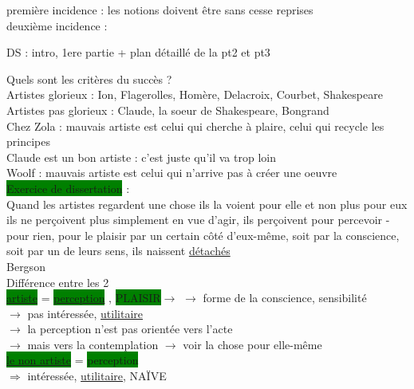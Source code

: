 \documentclass[a4paper,twocolumn,landscape]{article}
\begin{document}
\noindent
première incidence : les notions doivent être sans cesse reprises \\
deuxième incidence : 

DS : intro, 1ere partie + plan détaillé de la pt2 et pt3

\noindent
Quels sont les critères du succès ? \\
Artistes glorieux : Ion, Flagerolles, Homère, Delacroix, Courbet, Shakespeare\\
Artistes pas glorieux : Claude, la soeur de Shakespeare, Bongrand\\

\noindent
Chez Zola : mauvais artiste est celui qui cherche à plaire, celui qui recycle les principes\\
Claude est un bon artiste : c'est juste qu'il va trop loin\\
Woolf : mauvais artiste est celui qui n'arrive pas à créer une oeuvre\\

\noindent \colorbox{green}{Exercice de dissertation} : \\

\noindent
Quand les artistes regardent une chose ils la voient pour elle et 
non plus pour eux 
ils ne perçoivent plus simplement en vue d'agir, 
ils perçoivent pour percevoir - pour rien, pour le plaisir
par un certain côté d'eux-même, soit par la conscience, 
soit par un de leurs sens, ils naissent 
\underline{détachés}\\
Bergson\\

\noindent Différence entre les 2\\ 

\noindent
\colorbox{green}{\underline{artiste}} = 
\colorbox{green}{\underline{perception}} , 
\colorbox{green}{PLAISIR}\(\rightarrow\)  
\(\rightarrow\) forme de la conscience, sensibilité\\
\(\rightarrow\) pas intéressée, \underline{utilitaire}\\
\(\rightarrow\) la perception n'est pas orientée vers l'acte\\
\(\rightarrow\) mais vers la contemplation 
\(\rightarrow\) voir la chose pour elle-même\\
\colorbox{green}{\underline{le non artiste}} = 
\colorbox{green}{perception} \\
\(\Rightarrow\) intéressée, \underline{utilitaire}, NAÏVE\\
\end{document}
